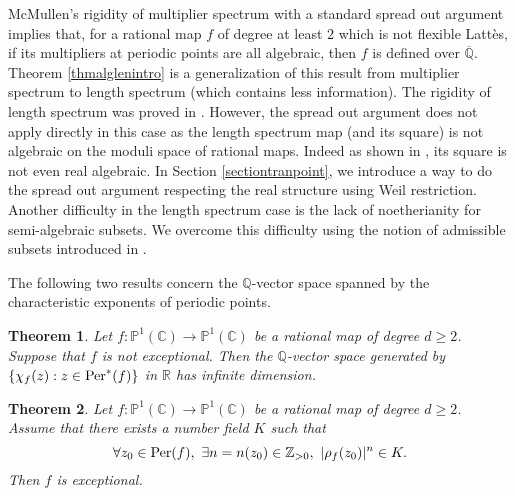 \documentclass[12pt]{amsart}
\theoremstyle{plain}
\newtheorem{Thm}{Theorem}[section]
\theoremstyle{remark}
\theoremstyle{definition}
\def\Z{\mathbb Z}
\def\Q{\mathbb Q}
\def\R{\mathbb R}
\def\C{\mathbb C}
\def\P{\mathbb P}
\begin{document}
McMullen's rigidity of multiplier spectrum \cite{McMullen1987} with a standard spread out argument implies that, for a rational map $f$ of degree at least $2$ which is not flexible Latt\`es, if its multipliers at periodic points are all algebraic, then $f$ is defined over $\overline{\Q}$.  Theorem \ref{thmalglenintro} is a generalization of this result from multiplier spectrum to length spectrum (which contains less information). The rigidity of length spectrum was proved in \cite[Theorem 1.5]{Ji2023}. However, the spread out argument does not apply directly in this case as the length spectrum map (and its square) is not algebraic on the moduli space of rational maps. Indeed as shown in \cite[Section 8.1]{Ji2023},  its square is not even real algebraic. 
In Section \ref{sectiontranpoint}, we introduce a way to do the spread out argument respecting the real structure using Weil restriction. 
Another difficulty in the length spectrum case is the lack of noetherianity for semi-algebraic subsets.
We overcome this difficulty using the notion of admissible subsets introduced in \cite{Ji2023}.
\medskip

The following two results concern the $\Q$-vector space spanned by the characteristic exponents of periodic points. 
\begin{Thm}\label{thmmaindim}
	Let $f:\P^1(\C)\to\P^1(\C)$ be a rational map of degree $d\geq2$. Suppose that $f$ is not exceptional. Then the $\Q$-vector space generated by $\{\chi_f(z):z\in{\rm Per}^*(f)\}$ in $\R$ has infinite dimension.
\end{Thm}

\medskip


\begin{Thm}\label{thmmainnumf}
	Let $f:\P^1(\C)\to\P^1(\C)$ be a rational map of degree $d\geq2$. Assume that there exists a number field $K$ such that 
	\begin{equation}\label{equassnorm}
		\forall z_0\in{\rm Per}(f),\ \exists
		n=n(z_0)\in\Z_{>0},\ \lvert\rho_f(z_0)\rvert^n\in K.
	\end{equation} Then $f$ is exceptional.
\end{Thm}
\end{document}
